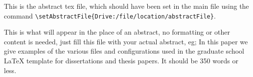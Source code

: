 This is the abstract tex file, which should have been set in the main file using the command \verb|\setAbstractFile{Drive:/file/location/abstractFile}|.

This is what will appear in the place of an abstract, no formatting or other content is needed, just fill this file with your actual abstract, eg; In this paper we give examples of the various files and configurations used in the graduate school \LaTeX{} template for dissertations and thesis papers. It should be 350 words or less.